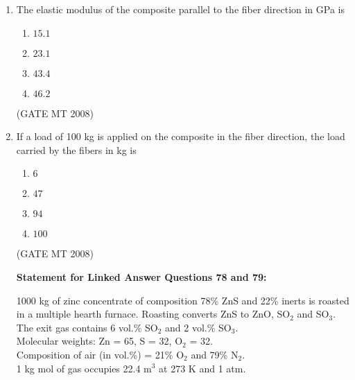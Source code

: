 \documentclass[11pt, letterpaper]{article}
\theoremstyle{remark}
\begin{document}
\begin{enumerate}[label=Q.\arabic*]
    A polyester-matrix composite is unidirectionally reinforced with 60 vol.\% of E-glass fibers. 
    The elastic moduli of the matrix and the fiber are 6.9 and 72.4 GPa, respectively.
\hfill(GATE MT 2008)
    \item The elastic modulus of the composite parallel to the fiber direction in GPa is
    \begin{multicols}{4}
        \begin{enumerate}[label=(\MakeUppercase{\alph*})]
            \item $15.1$
            \item $23.1$
            \item $43.4$
            \item $46.2$
        \end{enumerate}
    \end{multicols}
\hfill(GATE MT 2008)
        \item If a load of 100 kg is applied on the composite in the fiber direction, the load carried by the fibers in kg is
    \begin{multicols}{4}
        \begin{enumerate}[label=(\MakeUppercase{\alph*})]
            \item $6$
            \item $47$
            \item $94$
            \item $100$
        \end{enumerate}
    \end{multicols}
\hfill(GATE MT 2008)
    \vspace{0.5em}
    
    \textbf{Statement for Linked Answer Questions 78 and 79:}

    1000 kg of zinc concentrate of composition 78\% ZnS and 22\% inerts is roasted in a multiple hearth furnace.
    Roasting converts ZnS to ZnO, SO$_2$ and SO$_3$. The exit gas contains 6 vol.\% SO$_2$ and 2 vol.\% SO$_3$. \\
    Molecular weights: Zn = 65, S = 32, O$_2$ = 32. \\
    Composition of air (in vol.\%) = 21\% O$_2$ and 79\% N$_2$. \\
    1 kg mol of gas occupies 22.4 m$^3$ at 273 K and 1 atm.


\end{enumerate}
\end{document}
